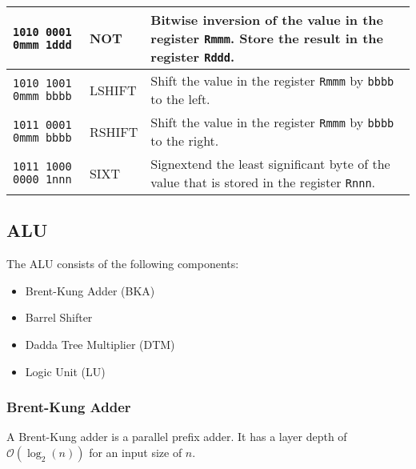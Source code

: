 \documentclass[twoside]{article}
\begin{document}
\begin{table}[H]
\begin{longtable}{m{}m{}m{}}
                                                    \hline
                                                    \bigstrut
        \texttt{1010 0001 0mmm 1ddd} & NOT       & Bitwise inversion of the value in
                                                    the register \texttt{Rmmm}. Store
                                                    the result in the register
                                                    \texttt{Rddd}.\\
                                                    \hline
                                                    \bigstrut
        \texttt{1010 1001 0mmm bbbb} & LSHIFT    & Shift the value in the register
                                                    \texttt{Rmmm} by \texttt{bbbb} to
                                                    the left.\\
                                                    \hline
                                                    \bigstrut
        \texttt{1011 0001 0mmm bbbb} & RSHIFT    & Shift the value in the register
                                                    \texttt{Rmmm} by \texttt{bbbb} to
                                                    the right.\\
                                                    \hline
                                                    \bigstrut
        \texttt{1011 1000 0000 1nnn} & SIXT      & Signextend the least significant
                                                    byte of the value that is stored
                                                    in the register \texttt{Rnnn}.\\
                                                    \hline
    \end{longtable}
\end{table}

\subsection*{ALU}
The ALU consists of the following components:
\begin{itemize}
    \item Brent-Kung Adder (BKA)
    \item Barrel Shifter
    \item Dadda Tree Multiplier (DTM)
    \item Logic Unit (LU)
\end{itemize}

\subsubsection*{Brent-Kung Adder}
A Brent-Kung adder is a parallel prefix adder. It has a layer depth of
$\mathcal{O}(\log_2(n))$ for an input size of $n$.
\end{document}
